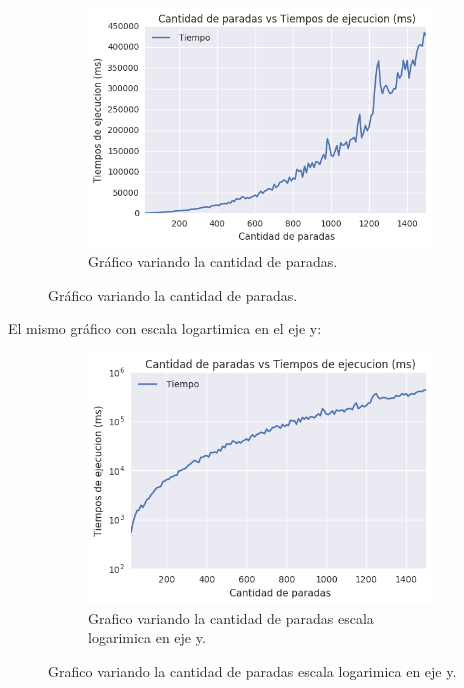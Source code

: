 \begin{figure}[H]
  \begin{center}
    \begin{subfigure}[b]{0.70\textwidth}
        \includegraphics[width=\textwidth]{img/ejercicio2/losPosta/grafico_sin_logs.png}
        \caption{Gráfico variando la cantidad de paradas.}
        \label{fig: ejercicio1_ejemplo_camino1_2}
   \end{subfigure}
  \end{center}
\end{figure}


El mismo gráfico con escala logartimica en el eje y:
\begin{figure}[H]
  \begin{center}
    \begin{subfigure}[b]{0.70\textwidth}
        \includegraphics[width=\textwidth]{img/ejercicio2/losPosta/grafico_log_y.png}
        \caption{Grafico variando la cantidad de paradas escala logarimica en eje y.}
        \label{fig: ejercicio1_ejemplo_camino1_2}
   \end{subfigure}
  \end{center}
\end{figure}

